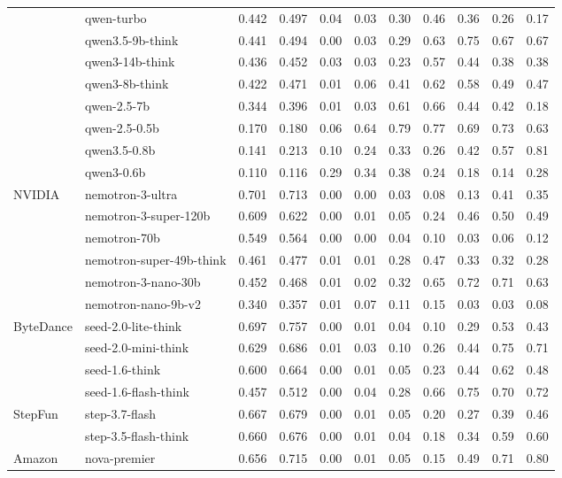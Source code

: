 \begin{longtable}{@{}ll rr rrrrrrr@{}}
 & qwen-turbo & 0.442 & 0.497 & 0.04 & 0.03 & 0.30 & 0.46 & 0.36 & 0.26 & 0.17 \\
 & qwen3.5-9b-think & 0.441 & 0.494 & 0.00 & 0.03 & 0.29 & 0.63 & 0.75 & 0.67 & 0.67 \\
 & qwen3-14b-think & 0.436 & 0.452 & 0.03 & 0.03 & 0.23 & 0.57 & 0.44 & 0.38 & 0.38 \\
 & qwen3-8b-think & 0.422 & 0.471 & 0.01 & 0.06 & 0.41 & 0.62 & 0.58 & 0.49 & 0.47 \\
 & qwen-2.5-7b & 0.344 & 0.396 & 0.01 & 0.03 & 0.61 & 0.66 & 0.44 & 0.42 & 0.18 \\
 & qwen-2.5-0.5b & 0.170 & 0.180 & 0.06 & 0.64 & 0.79 & 0.77 & 0.69 & 0.73 & 0.63 \\
 & qwen3.5-0.8b & 0.141 & 0.213 & 0.10 & 0.24 & 0.33 & 0.26 & 0.42 & 0.57 & 0.81 \\
 & qwen3-0.6b & 0.110 & 0.116 & 0.29 & 0.34 & 0.38 & 0.24 & 0.18 & 0.14 & 0.28 \\
NVIDIA & nemotron-3-ultra & 0.701 & 0.713 & 0.00 & 0.00 & 0.03 & 0.08 & 0.13 & 0.41 & 0.35 \\
 & nemotron-3-super-120b & 0.609 & 0.622 & 0.00 & 0.01 & 0.05 & 0.24 & 0.46 & 0.50 & 0.49 \\
 & nemotron-70b & 0.549 & 0.564 & 0.00 & 0.00 & 0.04 & 0.10 & 0.03 & 0.06 & 0.12 \\
 & nemotron-super-49b-think & 0.461 & 0.477 & 0.01 & 0.01 & 0.28 & 0.47 & 0.33 & 0.32 & 0.28 \\
 & nemotron-3-nano-30b & 0.452 & 0.468 & 0.01 & 0.02 & 0.32 & 0.65 & 0.72 & 0.71 & 0.63 \\
 & nemotron-nano-9b-v2 & 0.340 & 0.357 & 0.01 & 0.07 & 0.11 & 0.15 & 0.03 & 0.03 & 0.08 \\
ByteDance & seed-2.0-lite-think & 0.697 & 0.757 & 0.00 & 0.01 & 0.04 & 0.10 & 0.29 & 0.53 & 0.43 \\
 & seed-2.0-mini-think & 0.629 & 0.686 & 0.01 & 0.03 & 0.10 & 0.26 & 0.44 & 0.75 & 0.71 \\
 & seed-1.6-think & 0.600 & 0.664 & 0.00 & 0.01 & 0.05 & 0.23 & 0.44 & 0.62 & 0.48 \\
 & seed-1.6-flash-think & 0.457 & 0.512 & 0.00 & 0.04 & 0.28 & 0.66 & 0.75 & 0.70 & 0.72 \\
StepFun & step-3.7-flash & 0.667 & 0.679 & 0.00 & 0.01 & 0.05 & 0.20 & 0.27 & 0.39 & 0.46 \\
 & step-3.5-flash-think & 0.660 & 0.676 & 0.00 & 0.01 & 0.04 & 0.18 & 0.34 & 0.59 & 0.60 \\
Amazon & nova-premier & 0.656 & 0.715 & 0.00 & 0.01 & 0.05 & 0.15 & 0.49 & 0.71 & 0.80 \\

\end{longtable}
